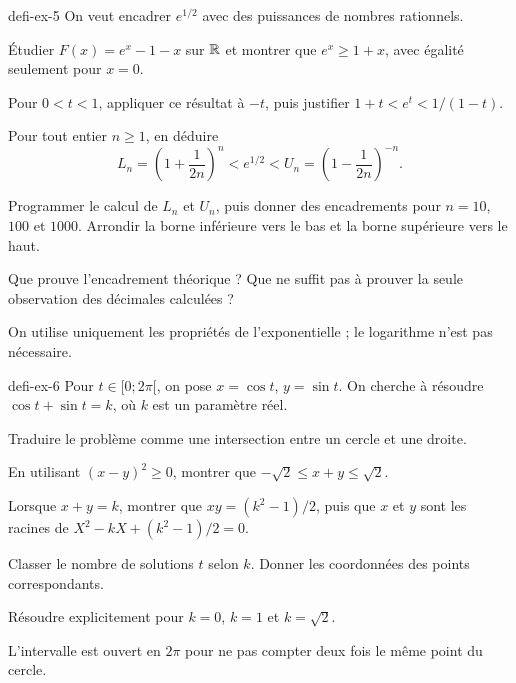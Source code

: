 \begin{blocEdition}{defi-ex-5}
On veut encadrer $e^{1/2}$ avec des puissances de nombres rationnels.
\begin{questions}
\item Étudier $F(x)=e^x-1-x$ sur $\mathbb{R}$ et montrer que $e^x\geq1+x$,
avec égalité seulement pour $x=0$.
\item Pour $0<t<1$, appliquer ce résultat à $-t$, puis justifier
$1+t<e^t<1/(1-t)$.
\item Pour tout entier $n\geq1$, en déduire
\[L_n=\left(1+\frac1{2n}\right)^n<e^{1/2}<
U_n=\left(1-\frac1{2n}\right)^{-n}.\]
\item Programmer le calcul de $L_n$ et $U_n$, puis donner des encadrements
pour $n=10$, $100$ et $1000$. Arrondir la borne inférieure vers le bas et la borne supérieure vers le haut.
\item Que prouve l'encadrement théorique ? Que ne suffit pas à prouver la seule observation des décimales calculées ?
\end{questions}
On utilise uniquement les propriétés de l'exponentielle ; le logarithme n'est pas nécessaire.
\end{blocEdition}

\begin{blocEdition}{defi-ex-6}
Pour $t\in[0;2\pi[$, on pose $x=\cos t$, $y=\sin t$. On cherche à résoudre
$\cos t+\sin t=k$, où $k$ est un paramètre réel.
\begin{questions}
\item Traduire le problème comme une intersection entre un cercle et une droite.
\item En utilisant $(x-y)^2\geq0$, montrer que $-\sqrt2\leq x+y\leq\sqrt2$.
\item Lorsque $x+y=k$, montrer que $xy=(k^2-1)/2$, puis que $x$ et $y$
sont les racines de $X^2-kX+(k^2-1)/2=0$.
\item Classer le nombre de solutions $t$ selon $k$. Donner les coordonnées des points correspondants.
\item Résoudre explicitement pour $k=0$, $k=1$ et $k=\sqrt2$.
\end{questions}
L'intervalle est ouvert en $2\pi$ pour ne pas compter deux fois le même point du cercle.
\label{figedition-defi-ex-6-1}
\end{blocEdition}

